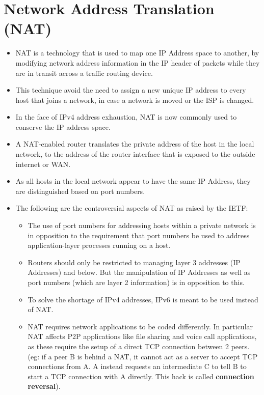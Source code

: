 \documentclass[a4paper]{article}
\theoremstyle{plain}
\theoremstyle{definition}
\begin{document}
\section{Network Address Translation (NAT)}
\begin{itemize}
    \item NAT is a technology that is used to map one IP Address space to another, by modifying network address information in the IP header of packets while they are in transit across a traffic routing device.
    
    \item This technique avoid the need to assign a new unique IP address to every host that joins a network, in case a network is moved or the ISP is changed. 
    
    \item In the face of IPv4 address exhaustion, NAT is now commonly used to  conserve the IP address space.
    
    \item A NAT-enabled router translates the private address of the host in the local network, to the address of the router interface that is exposed to the outside internet or WAN. 
    
    \item As all hosts in the local network appear to have the same IP Address, they are distinguished based on port numbers. 
    
    \item The following are the controversial aspects of NAT as raised by the IETF:
    \begin{itemize}
        \item The use of port numbers for addressing hosts within a private network is in opposition to the requirement that port numbers be used to address application-layer processes running on a host.
        
        \item Routers should only be restricted to managing layer 3 addresses (IP Addresses) and below. But the manipulation of IP Addresses as well as port numbers (which are layer 2 information) is in opposition to this.
        
        \item To solve the shortage of IPv4 addresses, IPv6 is meant to be used instead of NAT. 
        
        \item NAT requires network applications to be coded differently. In particular NAT affects P2P applications like file sharing and voice call applications, as these require the setup of a direct TCP connection between 2 peers.  (eg: if a peer B is behind a NAT, it cannot act as a server to accept TCP connections from A. A instead requests an intermediate C to tell B to start a TCP connection with A directly. This hack is called \textbf{connection reversal}).
    \end{itemize}
\end{itemize}
\end{document}
